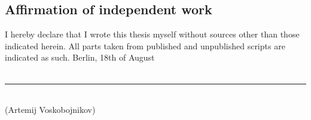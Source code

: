 \subsection*{Affirmation of independent work}
I hereby declare that I wrote this thesis myself without sources other than
those indicated herein. All parts taken from published and unpublished
scripts are indicated as such.
\parbig
Berlin, 18th of August
\\\\

\rule{120pt}{1pt}\\
(Artemij Voskobojnikov)